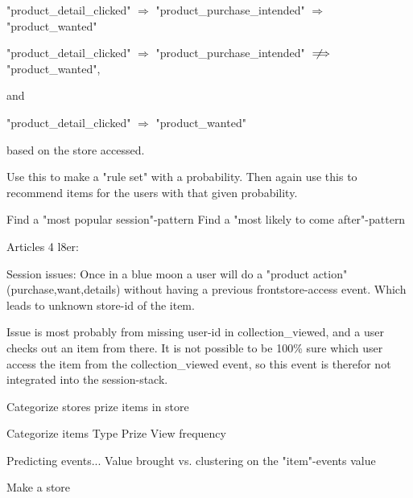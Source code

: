 "product\_detail\_clicked" $\Rightarrow$ "product\_purchase\_intended" $\Rightarrow$ "product\_wanted"

"product\_detail\_clicked" $\Rightarrow$ "product\_purchase\_intended" $\notimplies$ "product\_wanted",

and

"product\_detail\_clicked" $\Rightarrow$ "product\_wanted"

based on the store accessed.

Use this to make a "rule set" with a probability.
Then again use this to recommend items for the users with that given
probability.

Find a "most popular session"-pattern
Find a "most likely to come after"-pattern


Articles 4 l8er:

Session issues:
Once in a blue moon a user will do a "product action" (purchase,want,details)
without having a previous frontstore-access event. Which leads to unknown
store-id of the item.

Issue is most probably from missing user-id in collection\_viewed, and a user
checks out an item from there. It is not possible to be 100\% sure which user
access the item from the collection\_viewed event, so this event is therefor
not integrated into the session-stack.


Categorize stores
    prize
    items in store

Categorize items
    Type
    Prize
    View frequency

Predicting events...
    Value brought vs. clustering on the "item"-events value

Make a store




